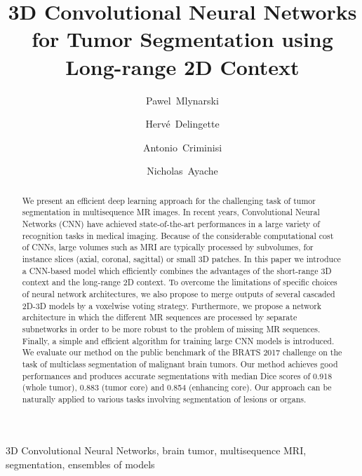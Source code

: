 \documentclass[preprint,12pt]{elsarticle}
\begin{document}
\begin{frontmatter}



\title{3D Convolutional Neural Networks for Tumor Segmentation using Long-range 2D Context}



\author[a]{Pawel~Mlynarski }
\author[a]{Herv\'e~Delingette}
\author[b]{Antonio~Criminisi}
\author[a]{Nicholas~Ayache}
\address[a]{Universit\'e C\^ote d'Azur, Inria Sophia Antipolis, France.}
\address[b]{Microsoft Research Cambridge, United Kingdom.}






\begin{abstract}
We present an efficient deep learning approach for the challenging task of tumor segmentation in multisequence MR images. In recent years, Convolutional Neural Networks (CNN) have achieved state-of-the-art performances in a large variety of recognition tasks in medical imaging. Because of the considerable computational cost of CNNs, large volumes such as MRI are typically processed by subvolumes, for instance slices (axial, coronal, sagittal) or small 3D patches. In this paper we introduce a CNN-based model which efficiently combines the advantages of the short-range 3D context and the long-range 2D context. To overcome the limitations of specific choices of neural network architectures, we also propose to merge outputs of several cascaded 2D-3D models by a voxelwise voting strategy. Furthermore, we propose a network architecture in which the different MR sequences are processed by separate subnetworks in order to be more robust to the problem of missing MR sequences. Finally, a simple and efficient algorithm for training large CNN models is introduced. We evaluate our method on the public benchmark of the BRATS 2017 challenge on the task of multiclass segmentation of malignant brain tumors. Our method achieves good performances and produces accurate segmentations with median Dice scores of 0.918 (whole tumor), 0.883 (tumor core) and 0.854 (enhancing core). Our approach can be naturally applied to various tasks involving segmentation of lesions or organs.
\end{abstract}

\begin{keyword}
3D Convolutional Neural Networks, brain tumor, multisequence MRI, segmentation, ensembles of models


\end{keyword}

\end{frontmatter}
\end{document}

